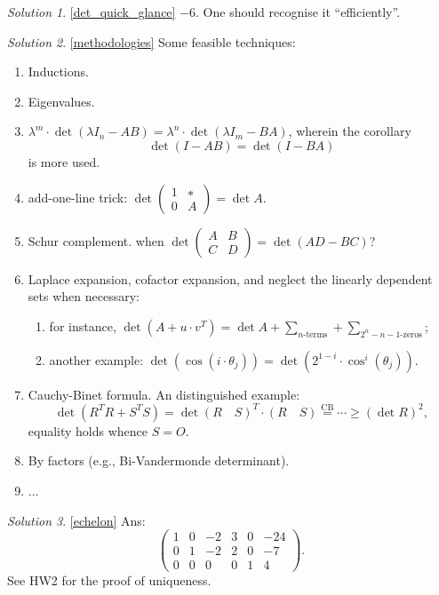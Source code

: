 \documentclass[12pt, reqno]{amsart}
\theoremstyle{plain}
\theoremstyle{definition}
\theoremstyle{remark}
\numberwithin{equation}{section}
\newtheorem*{solution}{Solution}
\begin{document}
\begin{solution}\ref{det_quick_glance}
    $-6$. One should recognise it ``efficiently''.
\end{solution}

\begin{solution}\ref{methodologies}
    Some feasible techniques:
    \begin{enumerate}
        \item Inductions.
        \item Eigenvalues.
        \item $λ^m ⋅ \det (λ I_n - AB) = λ^n ⋅ \det (λ I_m - BA)$, wherein the corollary
              \begin{equation}
                  \det(I-AB) = \det(I-BA)
              \end{equation}
              is more used.
        \item add-one-line trick: $\det \begin{pmatrix}
                      1 & ∗ \\ 0 & A
                  \end{pmatrix} = \det A$.
        \item Schur complement. when $\det\begin{pmatrix}
                      A & B \\C&D
                  \end{pmatrix}=\det(AD-BC)$?
        \item Laplace expansion, cofactor expansion, and neglect the linearly dependent sets when necessary:
              \begin{enumerate}
                  \item for instance, $\det (A + u ⋅ v^T) = \det A + ∑\limits_{\text{$n$-terms}} + ∑ \limits_\text{$2^n - n - 1$-zeros}$;
                  \item another example: $\det (\cos (i⋅ θ_j)) = \det (2^{1-i}⋅ \cos^i (θ_j))$.
              \end{enumerate}
        \item Cauchy-Binet formula. An distinguished example:
              \begin{equation}
                  \det (R^TR + S^TS) = \det (R\quad S)^T ⋅ (R\quad S) \overset{\text{CB}}{ = }  \cdots ≥ (\det R)^2,
              \end{equation}
              equality holds whence $S=O$.
        \item By factors (e.g., Bi-Vandermonde determinant).
        \item ...
    \end{enumerate}
\end{solution}

\begin{solution}\ref{echelon}
    Ans:
    \begin{equation}
        \begin{pmatrix}
            1 & 0 & −2 & 3 & 0 & −24 \\
            0 & 1 & −2 & 2 & 0 & −7  \\
            0 & 0 & 0  & 0 & 1 & 4
        \end{pmatrix}.
    \end{equation}
    See HW2 for the proof of uniqueness.
\end{solution}
\end{document}
